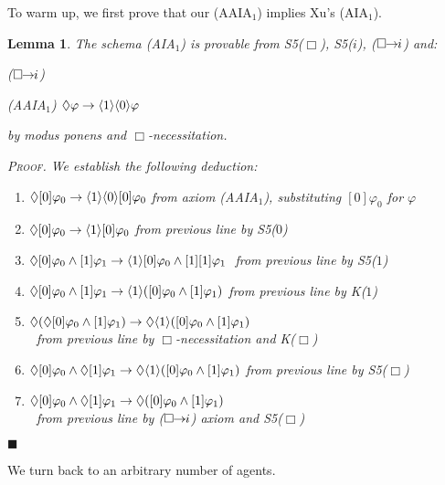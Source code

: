 \documentclass{article}
\newtheorem{lemma}{Lemma}
\newenvironment{pf}{\em \medskip\noindent \textsc{Proof.}}
{\hspace*{\fill}\nolinebreak[2]\hspace*{\fill}$\blacksquare$\medskip}
\renewcommand{\phi}{\varphi}
\newcommand{\cstit}[1]{[{#1}]}           \newcommand{\poscstit}[1]{\langle {#1} \rangle}    \newcommand{\dstit}[2]{[{#1}\ \mathit{dstit}\! :{#2}]}
\newcommand{\InclBox}[1]{$\Box \!\! \imp \!\! #1$}
\begin{document}
To warm up, we first prove that our (AAIA$_1$) implies Xu's (AIA$_1$).

\begin{lemma}\label{ortho-theo}
The schema (AIA$_1$) is provable from
S5($\Box$), S5($i$), (\InclBox{i})
and:
\begin{itemlist}{(\InclBox{i})}
  \item[(AAIA$_1$)]
$\Diamond\phi \imp \poscstit{1} \poscstit{0} \phi $
\end{itemlist}
by modus ponens and $\Box$-necessitation.


\begin{pf}
We establish the following deduction:
\begin{enumerate}
 \item $\Diamond \cstit{0} \phi_0 \imp \poscstit{1} \poscstit{0}\cstit{0} \phi_0
$ \hfill from axiom (AAIA$_1$), substituting $\cstit{0}\phi_0$ for $\phi$
\item $\Diamond \cstit{0} \phi_0 \imp \poscstit{1} \cstit{0} \phi_0
$ \hfill from previous line by S5($0$)
\item $\Diamond \cstit{0} \phi_0 \land \cstit{1}\phi_1 \imp \poscstit{1} \cstit{0} \phi_0 \land \cstit{1}\cstit{1}\phi_1
$    $~$\hfill from previous line by S5($1$)
\item $\Diamond \cstit{0} \phi_0 \land \cstit{1}\phi_1 \imp \poscstit{1}(\cstit{0} \phi_0 \land \cstit{1}\phi_1 )
$ \hfill from previous line by K($1$)
\item $\Diamond (\Diamond \cstit{0}\phi_0 \land \cstit{1} \phi_1) \imp \Diamond\poscstit{1} (\cstit{0}\phi_0 \land \cstit{1} \phi_1)
$ \\
$~$ \hfill from previous line by $\Box$-necessitation and K($\Box$)
\item $\Diamond\cstit{0}\phi_0 \land \Diamond \cstit{1} \phi_1 \imp \Diamond\poscstit{1} (\cstit{0}\phi_0 \land \cstit{1} \phi_1)
$ \hfill from previous line by S5($\Box$)
\item $\Diamond\cstit{0}\phi_0 \land \Diamond \cstit{1} \phi_1 \imp \Diamond (\cstit{0}\phi_0 \land \cstit{1} \phi_1)
$ \\    $~$
\hfill from previous line by (\InclBox{i}) axiom
and S5($\Box$)

\end{enumerate}
\end{pf}

\end{lemma}

We turn back to an arbitrary number of agents.
\end{document}
